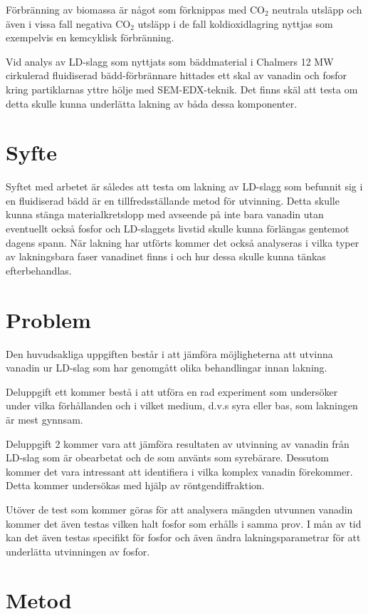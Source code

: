 \documentclass{article}
\begin{document}
 Förbränning av biomassa är något som förknippas med CO$_2$ neutrala utsläpp och även i vissa fall negativa CO$_2$ utsläpp i de fall koldioxidlagring nyttjas som exempelvis en kemcyklisk förbränning\cite{Zevenhoven2018}.

Vid analys av LD-slagg som nyttjats som bäddmaterial i Chalmers 12 MW cirkulerad fluidiserad bädd-förbrännare hittades ett skal av vanadin och fosfor kring partiklarnas yttre hölje med SEM-EDX-teknik. Det finns skäl att testa om detta skulle kunna underlätta lakning av båda dessa komponenter.

\section{Syfte}
Syftet med arbetet är således att testa om lakning av LD-slagg som befunnit sig i en fluidiserad bädd är en tillfredsställande metod för utvinning. Detta skulle kunna stänga materialkretslopp med avseende på inte bara vanadin utan eventuellt också fosfor och LD-slaggets livstid skulle kunna förlängas gentemot dagens spann. När lakning har utförts kommer det också analyseras i vilka typer av lakningsbara faser vanadinet finns i och hur dessa skulle kunna tänkas efterbehandlas. 

\section{Problem}
Den huvudsakliga uppgiften består i att jämföra möjligheterna att utvinna vanadin ur LD-slag som har genomgått olika behandlingar innan lakning.

Deluppgift ett kommer bestå i att utföra en rad experiment som undersöker under vilka förhållanden och i vilket medium, d.v.s syra eller bas, som lakningen är mest gynnsam.


Deluppgift 2 kommer vara att jämföra resultaten av utvinning av vanadin från LD-slag som är obearbetat och de som använts som syrebärare. Dessutom kommer det vara intressant att identifiera i vilka komplex vanadin förekommer. Detta kommer undersökas med hjälp av röntgendiffraktion.

Utöver de test som kommer göras för att analysera mängden utvunnen vanadin kommer det även testas vilken halt fosfor som erhålls i samma prov.
I mån av tid kan det även testas specifikt för fosfor och även ändra lakningsparametrar för att underlätta utvinningen av fosfor.
\newpage
\section{Metod}
\end{document}
